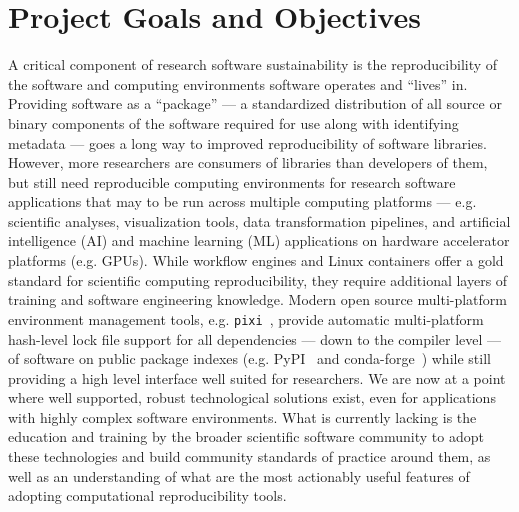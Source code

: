 \documentclass[letterpaper, 11pt]{article}
\newcommand{\pixi}{\texttt{pixi}}
\begin{document}
\pagestyle{fancy}

\section{Project Goals and Objectives}



A critical component of research software sustainability is the reproducibility of the software and computing environments software operates and ``lives'' in.
Providing software as a ``package'' --- a standardized distribution of all source or binary components of the software required for use along with identifying metadata --- goes a long way to improved reproducibility of software libraries.
However, more researchers are consumers of libraries than developers of them, but still need reproducible computing environments for research software applications that may to be run across multiple computing platforms --- e.g. scientific analyses, visualization tools, data transformation pipelines, and artificial intelligence (AI) and machine learning (ML) applications on hardware accelerator platforms (e.g. GPUs).
While workflow engines and Linux containers offer a gold standard for scientific computing reproducibility, they require additional layers of training and software engineering knowledge.
Modern open source multi-platform environment management tools, e.g. \pixi{}~\cite{Arts_pixi}, provide automatic multi-platform hash-level lock file support for all dependencies --- down to the compiler level --- of software on public package indexes (e.g. PyPI~\cite{PyPI_website} and conda-forge~\cite{conda-forge_community}) while still providing a high level interface well suited for researchers.
We are now at a point where well supported, robust technological solutions exist, even for applications with highly complex software environments.
What is currently lacking is the education and training by the broader scientific software community to adopt these technologies and build community standards of practice around them, as well as an understanding of what are the most actionably useful features of adopting computational reproducibility tools.
\end{document}
